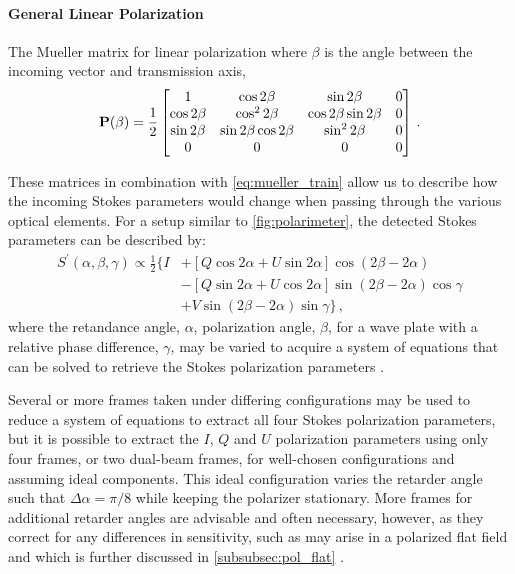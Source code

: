\paragraph{General Linear Polarization}
The Mueller matrix for linear polarization where $\beta$ is the angle between the incoming vector and transmission axis,
\begin{equation} \label{matrix:polarizer}
    \mathbf{P}(\beta) = \frac{1}{2}
    \begin{bmatrix}
        1            & \cos 2 \beta              & \sin 2 \beta              & 0 \\
        \cos 2 \beta & \cos^{2} 2 \beta          & \cos 2 \beta \sin 2 \beta & 0 \\
        \sin 2 \beta & \sin 2 \beta \cos 2 \beta & \sin^{2} 2 \beta          & 0 \\
        0            & 0                         & 0                         & 0 \\
    \end{bmatrix}\,.
\end{equation}

These matrices in combination with \autoref{eq:mueller_train} allow us to describe how the incoming Stokes parameters would change when passing through the various optical elements. For a setup similar to \autoref{fig:polarimeter}, the detected Stokes parameters can be described by:
\begin{equation} \label{eq:Stokes_intensity}
    \begin{split}
        S^{\prime}(\alpha, \beta, \gamma) \propto \frac{1}{2} \{ I & + [Q \cos2\alpha + U \sin2\alpha] \cos(2\beta - 2\alpha) \\
        & - [Q \sin2\alpha + U \cos2\alpha] \sin(2\beta - 2\alpha) \cos\gamma\\
        & + V \sin(2\beta - 2\alpha)\sin\gamma \}\,,
    \end{split}
\end{equation}
where the retandance angle, $\alpha$, polarization angle, $\beta$, for a wave plate with a relative phase difference, $\gamma$, may be varied to acquire a system of equations that can be solved to retrieve the Stokes polarization parameters \citep{waveplate_in_specpol}.

Several or more frames taken under differing configurations may be used to reduce a system of equations to extract all four Stokes polarization parameters, but it is possible to extract the $I$, $Q$ and $U$ polarization parameters using only four frames, or two dual-beam frames, for well-chosen configurations and assuming ideal components. This ideal configuration varies the retarder angle such that $\Delta\alpha = \pi / 8$ while keeping the polarizer stationary. More frames for additional retarder angles are advisable and often necessary, however, as they correct for any differences in sensitivity, such as may arise in a polarized flat field and which is further discussed in \autoref{subsubsec:pol_flat} \citep{polarimetry_error}.

